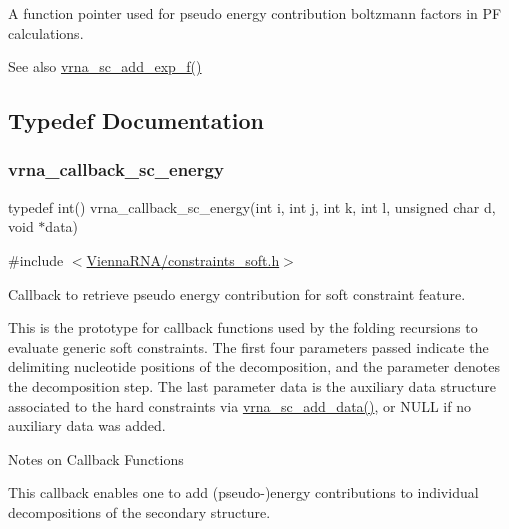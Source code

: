 A function pointer used for pseudo energy contribution boltzmann factors in PF calculations. 

\begin{DoxySeeAlso}{See also}
\hyperlink{group__soft__constraints_ga87e382b5d0c9b7d9ce1b79c0473ff700}{vrna\+\_\+sc\+\_\+add\+\_\+exp\+\_\+f()} 
\end{DoxySeeAlso}


\subsection{Typedef Documentation}
\mbox{\label{group__soft__constraints_ga88a266695d9e25cc12114dceb7b4565e}} 
\subsubsection{\texorpdfstring{vrna\+\_\+callback\+\_\+sc\+\_\+energy}{vrna\_callback\_sc\_energy}}
{\footnotesize\ttfamily typedef int() vrna\+\_\+callback\+\_\+sc\+\_\+energy(int i, int j, int k, int l, unsigned char d, void $\ast$data)}



{\ttfamily \#include $<$\hyperlink{constraints__soft_8h}{Vienna\+R\+N\+A/constraints\+\_\+soft.\+h}$>$}



Callback to retrieve pseudo energy contribution for soft constraint feature. 

This is the prototype for callback functions used by the folding recursions to evaluate generic soft constraints. The first four parameters passed indicate the delimiting nucleotide positions of the decomposition, and the parameter {\ttfamily denotes} the decomposition step. The last parameter {\ttfamily data} is the auxiliary data structure associated to the hard constraints via \hyperlink{group__soft__constraints_ga15c6d52471ec97897e2bb7f964f5deb6}{vrna\+\_\+sc\+\_\+add\+\_\+data()}, or N\+U\+LL if no auxiliary data was added.

\begin{DoxyRefDesc}{Notes on Callback Functions}
\item[\hyperlink{callbacks__callbacks000002}{Notes on Callback Functions}]This callback enables one to add (pseudo-\/)energy contributions to individual decompositions of the secondary structure. \end{DoxyRefDesc}


